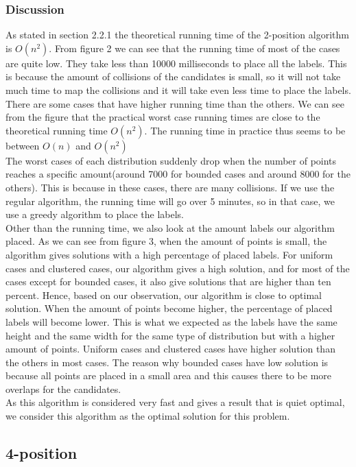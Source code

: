 \documentclass[crop=false,a4paper,oneside,11pt]{standalone}
\begin{document}
\subsubsection{Discussion}
As stated in section 2.2.1 the theoretical running time of the 2-position algorithm is $O(n^2)$. From figure 2 we can see that the running time of most of the cases are quite low. They take less than 10000 milliseconds to place all the labels. This is because the amount of collisions of the candidates is small, so it will not take much time to map the collisions and it will take even less time to place the labels. There are some cases that have higher running time than the others. We can see from the figure that the practical worst case running times are close to the theoretical running time $O(n^2)$. The running time in practice thus seems to be between $O(n)$ and $O(n^2)$ \\
The worst cases of each distribution suddenly drop when the number of points reaches a specific amount(around 7000 for bounded cases and around 8000 for the others). This is because in these cases, there are many collisions. If we use the regular algorithm, the running time will go over 5 minutes, so in that case, we use a greedy algorithm to place the labels.\\
Other than the running time, we also look at the amount labels our algorithm placed. As we can see from figure 3, when the amount of points is small, the algorithm gives solutions with a high percentage of placed labels. For uniform cases and clustered cases, our algorithm gives a high solution, and for most of the cases except for bounded cases, it also give solutions that are higher than ten percent. Hence, based on our observation, our algorithm is close to optimal solution. When the amount of points become higher, the percentage of placed labels will become lower. This is what we expected as the labels have the same height and the same width for the same type of distribution but with a higher amount of points. Uniform cases and clustered cases have higher solution than the others in most cases. The reason why bounded cases have low solution is because all points are placed in a small area and this causes there to be more overlaps for the candidates.\\
As this algorithm is considered very fast and gives a result that is quiet optimal, we consider this algorithm as the optimal solution for this problem.\\


\subsection{4-position}
\end{document}
